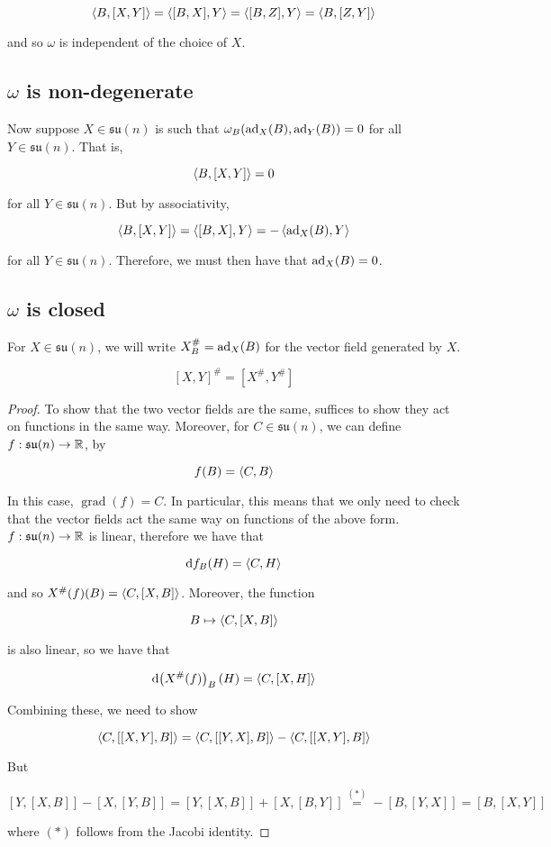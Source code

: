 \documentclass{article}
\newcommand{\su}{\mathfrak{su}}
\DeclareMathOperator{\gr}{grad}
\begin{document}
\[\left\langle B, [X, Y] \right\rangle = \left\langle [B, X], Y \right\rangle = \left\langle [B, Z], Y \right\rangle = \left\langle B, [Z, Y] \right\rangle\]

and so \(\omega\) is independent of the choice of \(X\).

\subsection{\(\omega\) is non-degenerate}

Now suppose \(X \in \su(n)\) is such that \(\omega_B(\operatorname{ad}_X(B), \operatorname{ad}_Y(B)) = 0\) for all \(Y \in \su(n)\). That is,

\[\left\langle B, [X, Y] \right\rangle = 0\]

for all \(Y \in \su(n)\). But by associativity,

\[\left\langle B, [X, Y] \right\rangle = \left\langle [B, X], Y \right\rangle = -\left\langle \operatorname{ad}_X(B), Y \right\rangle\]

for all \(Y \in \su(n)\). Therefore, we must then have that \(\operatorname{ad}_X(B) = 0\).

\subsection{\(\omega\) is closed}

For \(X \in \su(n)\), we will write \(X_B^\# = \operatorname{ad}_X(B)\) for the vector field generated by \(X\).

\begin{lemma}
    \[[X, Y]^\# = [X^\#, Y^\#]\]
\end{lemma}

\begin{proof}
    To show that the two vector fields are the same, suffices to show they act on functions in the same way. Moreover, for \(C \in \su(n)\), we can define \(f : \su(n) \to \R\), by 
    
    \[f(B) = \left\langle C, B \right\rangle\]
    
    In this case, \(\gr(f) = C\). In particular, this means that we only need to check that the vector fields act the same way on functions of the above form. \(f : \su(n) \to \R\) is linear, therefore we have that
    
    \[\dd f_B(H) = \left\langle C, H \right\rangle\]

    and so \(X^\#(f)(B) = \left\langle C, [X, B] \right\rangle\). Moreover, the function

    \[B \mapsto \left\langle C, [X, B] \right\rangle\]

    is also linear, so we have that

    \[\dd(X^\#(f))_B(H) = \left\langle C, [X, H] \right\rangle\]

    Combining these, we need to show

    \[\left\langle C, [[X, Y], B] \right\rangle = \left\langle C, [[Y, X], B] \right\rangle - \left\langle C, [[X, Y], B] \right\rangle\]

    But

    \[[Y, [X, B]] - [X, [Y, B]] = [Y, [X, B]] + [X, [B, Y]] \stackrel{(*)}{=} -[B, [Y, X]] = [B, [X, Y]]\]

    where \((*)\) follows from the Jacobi identity.
\end{proof}
\end{document}
